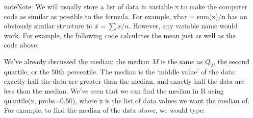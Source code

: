 \documentclass[letterpaper,10pt,english]{jupyterBook}
\begin{document}
\begin{sphinxadmonition}{note}{Note:}
\sphinxAtStartPar
We will usually store a list of data in variable x to make the computer code as similar as possible to the formula. For example, xbar = sum(x)/n has an obviously similar structure to \(\bar{x} = \sum x/n\). However, any variable name would work. For example, the following code calculates the mean just as well as the code above:

\begin{sphinxVerbatim}[commandchars=\\\{\}]

\end{sphinxVerbatim}
\end{sphinxadmonition}

\sphinxAtStartPar
We’ve already discussed the median: the median \(M\) is the same as \(Q_2\), the second quartile, or the 50th percentile. The median is the ‘middle value’ of the data: exactly half the data are greater than the median, and exactly half the data are less than the median. We’ve seen that we can find the median in R using quantile(x, probs=0.50), where x is the list of data values we want the median of. For example, to find the median of the data above, we would type:
\end{document}

